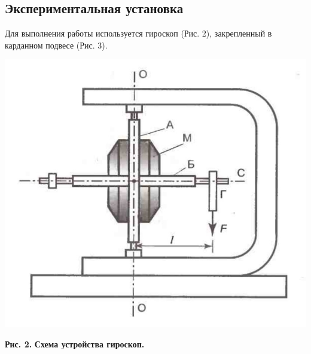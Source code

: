     
    
\subsection{Экспериментальная установка}
    
    Для выполнения работы используется гироскоп (Рис. 2), закрепленный в карданном подвесе (Рис. 3).


\begin{center}
\includegraphics[scale = 0.18]{giroskop.jpeg}
\end{center}
\begin{flushright}
{\scriptsize \textbf{Рис. 2.} \textbf {Схема устройства гироскоп.}}
\end{flushright}

